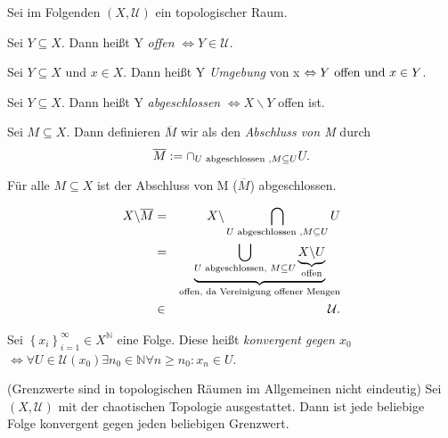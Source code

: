 \documentclass[10pt]{scrbook}
\begin{document}
Sei im Folgenden $(X, \mathcal{U})$ ein topologischer Raum.

\begin{Def}
Sei $Y\subseteq X$. Dann heißt Y \emph{offen} $\Leftrightarrow Y\in \mathcal{U}$.
\end{Def}

\begin{Def}
Sei $Y\subseteq X$ und $x\in X$. Dann heißt Y \emph{Umgebung} von x $\Leftrightarrow Y \textnormal{ offen und } x\in Y$.
\end{Def}

\begin{Def}
Sei $Y\subseteq X$. Dann heißt Y \emph{abgeschlossen} $\Leftrightarrow X\backslash Y$ offen ist.
\end{Def}

\begin{Def}
Sei $M\subseteq X$. Dann definieren $\overline{M}$ wir als den \emph{Abschluss von M} durch
\begin{displaymath}
	\overline{M} := \cap_{U\textnormal{ abgeschlossen }, M\subseteq U}{U}.
\end{displaymath}
\end{Def}

\begin{Sa}
Für alle $M\subseteq X$ ist der Abschluss von M ($\overline{M}$) abgeschlossen.
\end{Sa}
\begin{bew}
\begin{eqnarray*}
X \backslash \overline{M} & = & X \backslash \bigcap\limits_{U\textnormal{ abgeschlossen }, M\subseteq U}{U} \\
& = & \underbrace{\bigcup\limits_{U\textnormal{ abgeschlossen, } M\subseteq U}\underbrace{X\backslash U}_{\textnormal{offen}}}_{\textnormal{offen, da Vereinigung offener Mengen}} \\
& \in & \mathcal{U}.
\end{eqnarray*}
\end{bew}

\begin{Def}
Sei $\left\{x_i\right\}_{i=1}^\infty\in X^\mathbb{N}$ eine Folge. Diese heißt \emph{konvergent gegen $x_0$} $\Leftrightarrow \forall U\in\mathcal{U}(x_0) \exists n_0\in \mathbb{N} \forall n\geq n_0: x_n\in U$.
\end{Def}

\begin{Bsp} (Grenzwerte sind in topologischen Räumen im Allgemeinen nicht eindeutig) Sei $(X, \mathcal{U})$ mit der chaotischen Topologie ausgestattet. Dann ist jede beliebige Folge konvergent gegen jeden beliebigen Grenzwert.
\end{Bsp}
\end{document}

